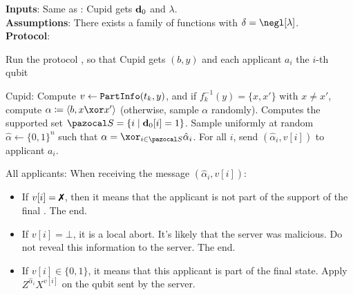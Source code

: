 \begin{protocol}[htbp]
  \caption{\blindCanSup{}}\label{protocol:blindCanSup}
  \textbf{Inputs}: Same as \blind{}: Cupid gets $\mathbf{d}_0$ and $\lambda$.\\
  \textbf{Assumptions}: There exists a \AssumpFctCan{} family of functions with $\delta = \negl[\lambda]$.\\
  \textbf{Protocol}:%
  \begin{compressedList}
    \item Run the protocol \blind{}, so that Cupid gets $(b,y)$ and each applicant $a_i$ the $i$-th qubit
    \item Cupid: Compute $v \gets {\tt PartInfo}(t_k,y)$, and if $f_k^{-1}(y) = \{x,x'\}$ with $x \neq x'$, compute $\alpha \eqdef \langle b, x \xor x'\rangle$ (otherwise, sample $\alpha$ randomly). Computes the supported set $\cS = \{i \mid \vect{d}_0[i] = 1\}$. Sample uniformly at random $\hat{\alpha} \leftarrow \{0,1\}^n$ such that $\alpha = \xor_{i \in \cS} \hat{\alpha}_i$. For all $i$, send $(\hat{\alpha}_i,v[i])$ to applicant $a_i$.
    \item All applicants: When receiving the message $(\hat{\alpha}_i,v[i])$:
    \begin{itemize}
      \item If $v[i] = \cross$, then it means that the applicant is not part of the support of the final \GHZ{}. The end.
      \item If $v[i] = \bot$, it is a local abort. It's likely that the server was malicious. Do not reveal this information to the server. The end.
      \item If $v[i] \in \{0,1\}$, it means that this applicant is part of the final \GHZ{} state. Apply $Z^{\hat{\alpha}_i}X^{v[i]}$ on the qubit sent by the server.
    \end{itemize}
  \end{compressedList}
\end{protocol}

